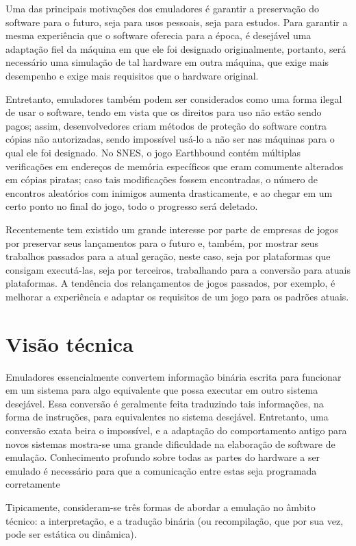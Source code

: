 \documentclass[12pt]{sftex/sftex}
\begin{document}
Uma das principais motivações dos emuladores é garantir a preservação do
software para o futuro, seja para usos pessoais, seja para estudos. Para
garantir a mesma experiência que o software oferecia para a época, é desejável
uma adaptação fiel da máquina em que ele foi designado originalmente, portanto,
será necessário uma simulação de tal hardware em outra máquina, que exige mais
desempenho e exige mais requisitos que o hardware original.

Entretanto, emuladores também podem ser considerados como uma forma ilegal de
usar o software, tendo em vista que os direitos para uso não estão sendo pagos;
assim, desenvolvedores criam métodos de proteção do software contra cópias não
autorizadas, sendo impossível usá-lo a não ser nas máquinas para o qual ele
foi designado. No SNES, o jogo Earthbound contém múltiplas verificações em
endereços de memória específicos que eram comumente alterados em cópias piratas;
caso tais modificações fossem encontradas, o número de encontros aleatórios com
inimigos aumenta drasticamente, e ao chegar em um certo ponto no final do jogo,
todo o progresso será deletado.

Recentemente tem existido um grande interesse por parte de empresas de jogos por
preservar seus lançamentos para o futuro e, também, por mostrar seus trabalhos
passados para a atual geração, neste caso, seja por plataformas que consigam
executá-las, seja por terceiros, trabalhando para a conversão para atuais
plataformas. A tendência dos relançamentos de jogos passados, por exemplo, é
melhorar a experiência e adaptar os requisitos de um jogo para os padrões
atuais.

\section{Visão técnica}

Emuladores essencialmente convertem informação binária escrita para funcionar em
um sistema para algo equivalente que possa executar em outro sistema desejável.
Essa conversão é geralmente feita traduzindo tais informações, na forma de
instruções, para equivalentes no sistema desejável. Entretanto, uma conversão
exata beira o impossível, e a adaptação do comportamento antigo para novos
sistemas mostra-se uma grande dificuldade na elaboração de software de emulação.
Conhecimento profundo sobre todas as partes do hardware a ser emulado é
necessário para que a comunicação entre estas seja programada corretamente

Tipicamente, consideram-se três formas de abordar a emulação no âmbito técnico:
a interpretação, e a tradução binária (ou recompilação, que por sua vez, pode
ser estática ou dinâmica).
\end{document}
